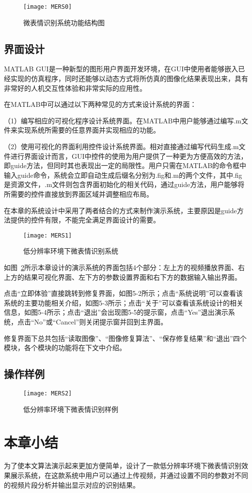 \begin{figure}[!htbp]
    \centering
    \texttt{[image: MERS0]}
    \caption{微表情识别系统功能结构图}
    \label{fig26}
\end{figure}

\subsection{界面设计}

MATLAB GUI是一种新型的图形用户界面开发环境，在GUI中使用者能够嵌入已经实现的仿真程序，同时还能够以动态方式将所仿真的图像化结果表现出来，具有非常好的人机交互性体验和非常实际的应用性。

在MATLAB中可以通过以下两种常见的方式来设计系统的界面：

（1）编写相应的可视化程序设计系统界面。在MATLAB中用户能够通过编写.m文件来实现系统所需要的任意界面并实现相应的功能。

（2）使用可视化的界面利用控件设计系统界面。相对直接通过编写代码生成.m文件进行界面设计而言，GUI中控件的使用为用户提供了一种更为方便高效的方法，即guide方法，但同时其也表现出一定的局限性。用户只需在MATLAB的命令框中输入guide命令，系统会立即自动生成后缀名分别为.fig和.m的两个文件，其中.fig是资源文件，.m文件则包含界面初始化的相关代码，通过guide方法，用户能够将所需要的控件直接放到界面区域并调整相应布局。

在本章的系统设计中采用了两者结合的方式来制作演示系统，主要原因是guide方法提供的控件有限，不能完全满足界面设计的需要。

\begin{figure}[!htbp]
    \centering
    \texttt{[image: MERS1]}
    \caption{低分辨率环境下微表情识别系统}
    \label{fig27}
\end{figure}

如图~\ref{fig27}所示本章设计的演示系统的界面包括4个部分：左上方的视频播放界面、右上方的结果可视化界面、左下方的参数设置界面和右下方的数据输入输出界面。

点击“立即体验”直接跳转到修复界面，如图5-2所示；点击“系统说明”可以查看该系统的主要功能相关介绍，如图5-3所示；点击“关于”可以查看该系统设计的相关信息，如图5-4所示；点击“退出”会出现图5-5的提示窗，点击“Yes”退出演示系统，点击“No”或“Cancel”则关闭提示窗并回到主界面。

修复界面下总共包括“读取图像”、“图像修复算法”、“保存修复结果”和“退出”四个模块，各个模块的功能将在下文中介绍。



\subsection{操作样例}

\begin{figure}[!htbp]
    \centering
    \texttt{[image: MERS2]}
    \caption{低分辨率环境下微表情识别样例}
    \label{fig28}
\end{figure}

\section{本章小结}

为了使本文算法演示起来更加方便简单，设计了一款低分辨率环境下微表情识别效果展示系统，在这款系统中用户可以通过上传视频，并通过设置不同的参数对不同的视频片段分析并输出显示对应的识别结果。
